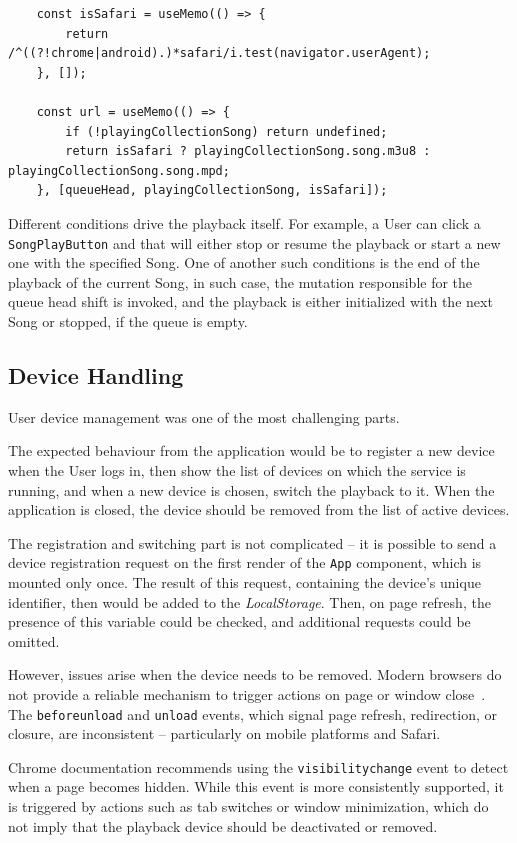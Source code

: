 \begin{verbatim}
    const isSafari = useMemo(() => {
        return /^((?!chrome|android).)*safari/i.test(navigator.userAgent);
    }, []);

    const url = useMemo(() => {
        if (!playingCollectionSong) return undefined;
        return isSafari ? playingCollectionSong.song.m3u8 : playingCollectionSong.song.mpd;
    }, [queueHead, playingCollectionSong, isSafari]);
\end{verbatim}

Different conditions drive the playback itself. For example, a User can click
a \texttt{SongPlayButton} and that will either stop or resume the playback or start
a new one with the specified Song. One of another such conditions is the end of the
playback of the current Song, in such case, the mutation responsible for the queue head
shift is invoked, and the playback is either initialized with the next Song or stopped, if the
queue is empty.

\subsection{Device Handling}\label{subsec:fedevices}
User device management was one of the most challenging parts.

The expected behaviour from the application would be to register a new device when
the User logs in, then show the list of devices on
which the service is running, and when a new device is chosen, switch the playback to it.
When the application is closed, the device should be removed from the list of active devices.

The registration and switching part is not complicated -- it is possible to send
a device registration request on the first render of the \texttt{App} component,
which is mounted only once. The result of this request,
containing the device's unique identifier, then would be added to the \textit{LocalStorage}.
Then, on page refresh, the presence of this variable could be checked, and additional requests
could be omitted.


However, issues arise when the device needs to be removed.
Modern browsers do not provide a reliable mechanism to trigger actions on
page or window close~\cite{chromelfapi,beacons}.
The \texttt{beforeunload} and \texttt{unload} events,
which signal page refresh, redirection, or closure,
are inconsistent -- particularly on mobile platforms and Safari.


Chrome documentation recommends using the \texttt{visibilitychange} event to detect when
a page becomes hidden. While this event is more
consistently supported, it is triggered by actions such as
tab switches or window minimization, which do not imply that the
playback device should be deactivated or removed.


